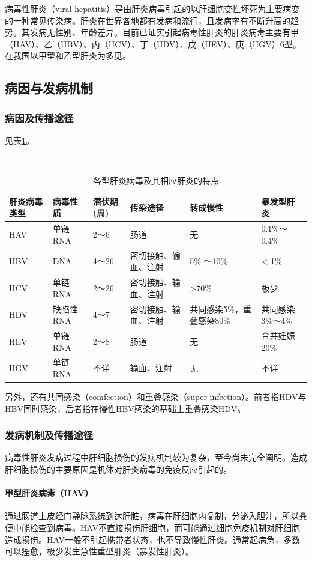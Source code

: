 病毒性肝炎（viral
hepatitis）是由肝炎病毒引起的以肝细胞变性坏死为主要病变的一种常见传染病。肝炎在世界各地都有发病和流行，且发病率有不断升高的趋势。其发病无性别、年龄差异。目前已证实引起病毒性肝炎的肝炎病毒主要有甲（HAV）、乙（HBV）、丙（HCV）、丁（HDV）、戊（HEV）、庚（HGV）6型。在我国以甲型和乙型肝炎为多见。

\subsection{病因与发病机制}

\subsubsection{病因及传播途径}

见表\ref{tab8-3}。

　
\begin{table}[ht]
    \caption{各型肝炎病毒及其相应肝炎的特点}
    \label{tab8-3}
    \centering
    \begin{tabular}{lllp{2cm}p{2cm}l}
    \toprule
    肝炎病毒类型&病毒性质&  潜伏期(周)&传染途径&  转成慢性&暴发型肝炎\\
    \midrule
    HAV & 单链RNA & 2～6 & 肠道 & 无 & 0.1\%～0.4\%\\
HBV & DNA & 4～26 & 密切接触、输血、注射 & 5\% ～10\%&  < 1\%\\
HCV & 单链RNA & 2～26 & 密切接触、输血、注射&  >70\% & 极少\\
HDV & 缺陷性RNA & 4～7 & 密切接触、输血、注射&  共同感染5\%，重叠感染80\%&共同感染3\%～4\%\\
HEV & 单链RNA & 2～8 & 肠道 & 无 & 合并妊娠20\%\\
HGV & 单链RNA & 不详 & 输血、注射 & 无 & 不详\\
    \bottomrule
    \end{tabular}
\end{table}

另外，还有共同感染（coinfection）和重叠感染（super
infection）。前者指HDV与HBV同时感染，后者指在慢性HBV感染的基础上重叠感染HDV。

\subsubsection{发病机制及传播途径}

病毒性肝炎发病过程中肝细胞损伤的发病机制较为复杂，至今尚未完全阐明。造成肝细胞损伤的主要原因是机体对肝炎病毒的免疫反应引起的。

\paragraph{甲型肝炎病毒（HAV）}
通过肠道上皮经门静脉系统到达肝脏，病毒在肝细胞内复制，分泌入胆汁，所以粪便中能检查到病毒。HAV不直接损伤肝细胞，而可能通过细胞免疫机制对肝细胞造成损伤。HAV一般不引起携带者状态，也不导致慢性肝炎。通常起病急，多数可以痊愈，极少发生急性重型肝炎（暴发性肝炎）。


